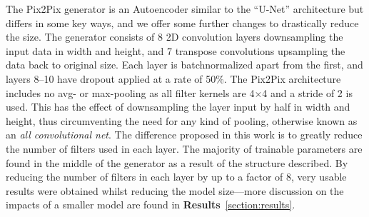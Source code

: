 \documentclass{article}
\begin{document}
The Pix2Pix generator is an Autoencoder similar to the ``U-Net'' architecture\cite{1505.04597} but differs in some key ways, and we offer some further changes to drastically reduce the size. The generator consists of 8 2D convolution layers downsampling the input data in width and height, and 7 transpose convolutions upsampling the data back to original size. Each layer is batchnormalized\cite{1502.03167} apart from the first, and layers 8--10 have dropout\cite{JMLR:v15:srivastava14a} applied at a rate of 50\%. The Pix2Pix architecture includes no avg- or max-pooling as all filter kernels are 4$\times$4 and a stride of 2 is used. This has the effect of downsampling the layer input by half in width and height, thus circumventing the need for any kind of pooling, otherwise known as an \textit{all convolutional net}\cite{1412.6806}. The difference proposed in this work is to greatly reduce the number of filters used in each layer. The majority of trainable parameters are found in the middle of the generator as a result of the structure described. By reducing the number of filters in each layer by up to a factor of 8, very usable results were obtained whilst reducing the model size---more discussion on the impacts of a smaller model are found in \textbf{Results}~\ref{section:results}.
\end{document}
